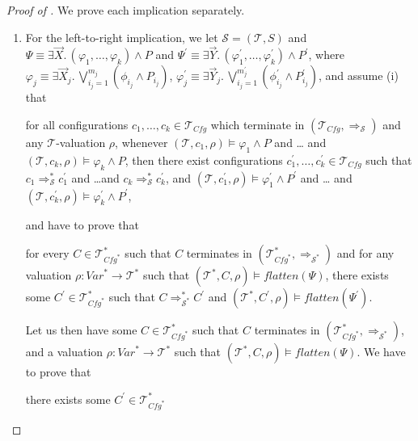 \documentclass{article}
\newcommand{\Var}{\mathit{Var}}
\newcommand{\Tcfg}{\mathcal{T}_{\mathit{Cfg}}}
\newenvironment{proofenv}
  {
    \VerbatimEnvironment\begin{tcolorbox}[colback=black!0!white] %
  }
  {
   \end{tcolorbox}
  }
\begin{document}
\begin{proof}[Proof of ]
We prove each implication separately.
\begin{enumerate}
    \item For the left-to-right implication, we
    let $\mathcal{S} = (\mathcal{T}, S)$
    and $\Psi \equiv  \exists \vec{X}.\, (\varphi_1,\ldots,\varphi_k) \land P$
    and $\Psi^\prime \equiv \exists \vec{Y}.\, (\varphi_1^\prime,\ldots,\varphi_k^\prime) \land P^\prime$,
    where $\varphi_j \equiv \exists \vec{X}_j.\, \bigvee_{i_j = 1}^{m_j} (\phi_{i_j} \land P_{i_j})$,
    $\varphi^\prime_j \equiv \exists \vec{Y}_j.\, \bigvee_{i_j = 1}^{m^\prime_j} (\phi^\prime_{i_j} \land P^\prime_{i_j})$,
    and assume (i) that
    \begin{proofenv}
    for all configurations $c_1,\ldots,c_k \in \Tcfg$
    which terminate in $(\Tcfg, \Rightarrow_{\mathcal{S}})$
    and any $\mathcal{T}$-valuation $\rho$,
    whenever $(\mathcal{T}, c_1,\rho) \vDash \varphi_1 \land P$ and \ldots
    and $(\mathcal{T}, c_k,\rho) \vDash \varphi_k \land P$,
    then there exist configurations $c_1^\prime,\ldots,c_k^\prime \in \Tcfg$
    such that $c_1 \Rightarrow^{*}_{\mathcal{S}} c_1^\prime$
    and \ldots and $c_k \Rightarrow^{*}_{\mathcal{S}} c_k^\prime$,
    and
    $(\mathcal{T}, c_1^\prime,\rho) \vDash \varphi^\prime_1 \land P^\prime$ and \ldots
    and $(\mathcal{T}, c_k^\prime, \rho) \vDash \varphi^\prime_k \land P^\prime$,
    \end{proofenv}
    and have to prove that
    \begin{proofenv}
    for every $C \in \mathcal{T}^*_{\mathit{Cfg}^*}$
    such that $C$ terminates in $(\mathcal{T}^*_{\mathit{Cfg}^*}, \Rightarrow_{\mathcal{S}^*})$
    and for any valuation $\rho : \Var^* \to \mathcal{T}^*$
    such that $(\mathcal{T}^*, C, \rho) \vDash \mathit{flatten}(\Psi)$,
    there exists some $C^\prime \in \mathcal{T}^*_{\mathit{Cfg}^*}$
    such that
    $C \Rightarrow^{*}_{\mathcal{S}^*} C^\prime$
    and $(\mathcal{T}^*, C^\prime, \rho) \vDash \mathit{flatten}(\Psi^\prime)$.
    \end{proofenv}
    Let us then have some $C \in \mathcal{T}^*_{\mathit{Cfg}^*}$
    such that $C$ terminates in $(\mathcal{T}^*_{\mathit{Cfg}^*}, \Rightarrow_{\mathcal{S}^*})$,
    and a valuation $\rho : \Var^* \to \mathcal{T}^*$
    such that $(\mathcal{T}^*, C, \rho) \vDash \mathit{flatten}(\Psi)$.
    We have to prove that
    \begin{proofenv}
    there exists some $C^\prime \in \mathcal{T}^*_{\mathit{Cfg}^*}$

\end{proofenv}
\end{enumerate}
\end{proof}
\end{document}
